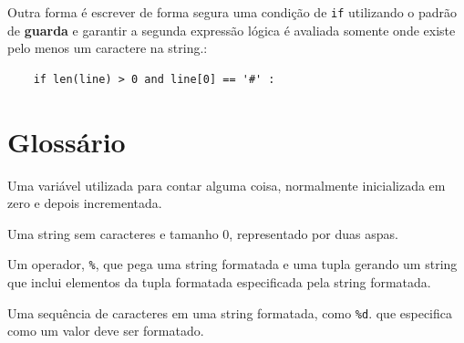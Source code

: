 {Outra forma é escrever de forma segura uma condição de {\tt if} utilizando o
padrão de {\bf guarda} e garantir a segunda expressão lógica é avaliada
somente onde existe pelo menos um caractere na string.:

\beforeverb
\begin{verbatim}
    if len(line) > 0 and line[0] == '#' :
\end{verbatim}
\afterverb
%

\section{Glossário}

\begin{descrição}
\item[contador:] Uma variável utilizada para contar alguma coisa, normalmente
	inicializada em zero e depois incrementada.

\item[string vazia:] Uma string sem caracteres e tamanho 0, representado por
	duas aspas.

\item[operador format:] Um operador, {\tt \%}, que pega uma string formatada
	e uma tupla gerando um string que inclui elementos da tupla formatada
	especificada pela string formatada.

\item[sequência formatada:] Uma sequência de caracteres em uma string formatada,
	como {\tt \%d}. que especifica como um valor deve ser formatado.


\end{descrição}}
